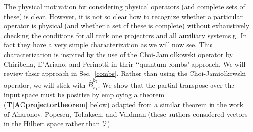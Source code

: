 \documentclass[10pt]{article}
\begin{document}
The physical motivation for considering physical operators (and complete sets of these) is clear.  However, it is not so clear how to recognize whether a particular operator is physical (and whether a set of these is complete) without exhaustively checking the conditions for all rank one projectors and all auxiliary systems $\mathsf g$.  In fact they have a very simple characterization as we will now see. This characterization is inspired by the use of the Choi-Jamio\l kowski operator by Chiribella, D'Ariano, and Perinotti in their \lq\lq quantum combs" approach.  We will review their approach in Sec.\ \ref{combs}.  Rather than using the Choi-Jamio\l kowski operator, we will stick with $\hat B_\mathsf{a_1}^\mathsf{b_2}$.  We show that the partial transpose over the input space must be positive by employing a theorem ({\bf T\ref{ACprojectortheorem}} below) adapted from a similar theorem in the work of Aharonov, Popescu, Tollaksen, and Vaidman \cite{aharonov2009multiple} (these authors considered vectors in the Hilbert space rather than ${\cal V}$).
\end{document}
